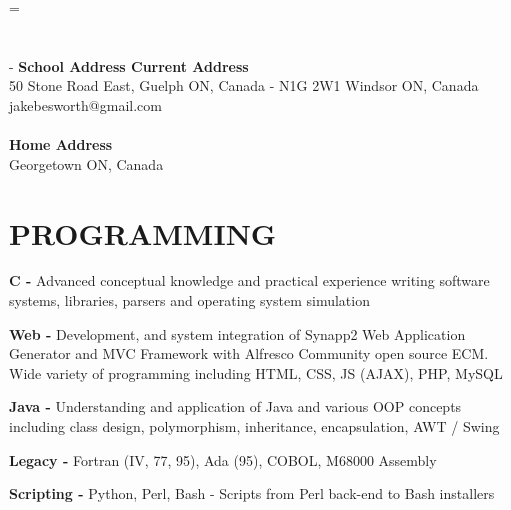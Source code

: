 \documentclass[line, margin]{res}
\begin{document}

\emergencystretch=\maxdimen
{}

\begin{resume}

\section{}
 -\sectionwidth \resumewidth
{
	\small{\textbf{School Address \hfill Current Address}}\\}
	{\color{darkgrey}\small {50 Stone Road East, Guelph ON, Canada -  N1G 2W1} \hfill {Windsor ON, Canada}\\}
	{\color{darkgrey}\small{} \hfill {jakebesworth@gmail.com\\\\}}
	{\small{\textbf{\hfill Home Address}}\\}
	{\color{darkgrey}\hfill \small{Georgetown ON, Canada}
}


\section{PROGRAMMING}
{
	\textbf{C - }{\color{darkgrey}Advanced conceptual knowledge and practical experience writing software systems, libraries, parsers and operating system simulation}

	\textbf{Web - }{\color{darkgrey}Development, and system integration of Synapp2 Web Application Generator and MVC Framework with Alfresco Community open source ECM. Wide variety of programming including HTML, CSS, JS (AJAX), PHP, MySQL}

	\textbf{Java - }{\color{darkgrey}Understanding and application of Java and various OOP concepts including class design, polymorphism, inheritance, encapsulation, AWT / Swing}

	\textbf{Legacy - }{\color{darkgrey}Fortran (IV, 77, 95), Ada (95), COBOL, M68000 Assembly}

	\textbf{Scripting - }{\color{darkgrey}Python, Perl, Bash - Scripts from Perl back-end to Bash installers\\[10pt]}

}


\end{resume}
\end{document}
